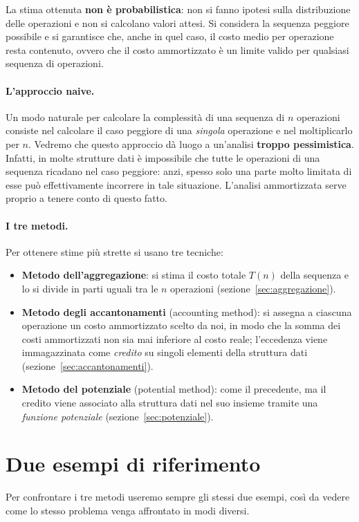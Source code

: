 \begin{osservazione}
La stima ottenuta \textbf{non è probabilistica}: non si fanno ipotesi sulla distribuzione delle operazioni e non si calcolano valori attesi. Si considera la sequenza peggiore possibile e si garantisce che, anche in quel caso, il costo medio per operazione resta contenuto, ovvero che il costo ammortizzato è un limite valido per qualsiasi sequenza di operazioni.
\end{osservazione}

\paragraph{L'approccio naive.}
Un modo naturale per calcolare la complessità di una sequenza di $n$ operazioni consiste nel calcolare il caso peggiore di una \emph{singola} operazione e nel moltiplicarlo per $n$. Vedremo che questo approccio dà luogo a un'analisi \textbf{troppo pessimistica}. Infatti, in molte strutture dati è impossibile che tutte le operazioni di una sequenza ricadano nel caso peggiore: anzi, spesso solo una parte molto limitata di esse può effettivamente incorrere in tale situazione. L'analisi ammortizzata serve proprio a tenere conto di questo fatto.

\paragraph{I tre metodi.}
Per ottenere stime più strette si usano tre tecniche:
\begin{itemize}
    \item \textbf{Metodo dell'aggregazione}: si stima il costo totale $T(n)$ della sequenza e lo si divide in parti uguali tra le $n$ operazioni (sezione~\ref{sec:aggregazione}).
    \item \textbf{Metodo degli accantonamenti} (accounting method): si assegna a ciascuna operazione un costo ammortizzato scelto da noi, in modo che la somma dei costi ammortizzati non sia mai inferiore al costo reale; l'eccedenza viene immagazzinata come \emph{credito} su singoli elementi della struttura dati (sezione~\ref{sec:accantonamenti}).
    \item \textbf{Metodo del potenziale} (potential method): come il precedente, ma il credito viene associato alla struttura dati nel suo insieme tramite una \emph{funzione potenziale} (sezione~\ref{sec:potenziale}).
\end{itemize}

\section{Due esempi di riferimento}\label{sec:esempi}
Per confrontare i tre metodi useremo sempre gli stessi due esempi, così da vedere come lo stesso problema venga affrontato in modi diversi.

